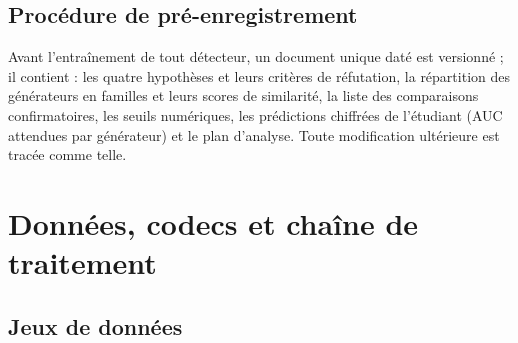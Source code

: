 \documentclass[11pt,a4paper]{article}
\begin{document}
\subsection{Procédure de pré-enregistrement}

Avant l'entraînement de tout détecteur, un document unique daté est versionné ; il contient : les quatre hypothèses et leurs critères de réfutation, la répartition des générateurs en familles et leurs scores de similarité, la liste des comparaisons confirmatoires, les seuils numériques, les prédictions chiffrées de l'étudiant (AUC attendues par générateur) et le plan d'analyse. Toute modification ultérieure est tracée comme telle.

\section{Données, codecs et chaîne de traitement}
\label{sec:donnees}

\subsection{Jeux de données}
\end{document}
